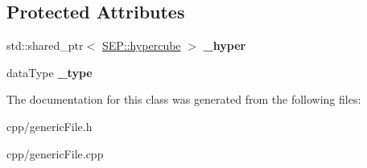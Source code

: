\subsection*{Protected Attributes}
\begin{DoxyCompactItemize}
\item 
\mbox{\label{class_s_e_p_1_1generic_reg_file_a352f0be3230718ec18749ff20ed77751}} 
std\+::shared\+\_\+ptr$<$ \hyperlink{class_s_e_p_1_1hypercube}{S\+E\+P\+::hypercube} $>$ {\bfseries \+\_\+hyper}
\item 
\mbox{\label{class_s_e_p_1_1generic_reg_file_afec1c3a487c02382fb69296aaa00ceba}} 
data\+Type {\bfseries \+\_\+type}
\end{DoxyCompactItemize}


The documentation for this class was generated from the following files\+:\begin{DoxyCompactItemize}
\item 
cpp/generic\+File.\+h\item 
cpp/generic\+File.\+cpp\end{DoxyCompactItemize}

